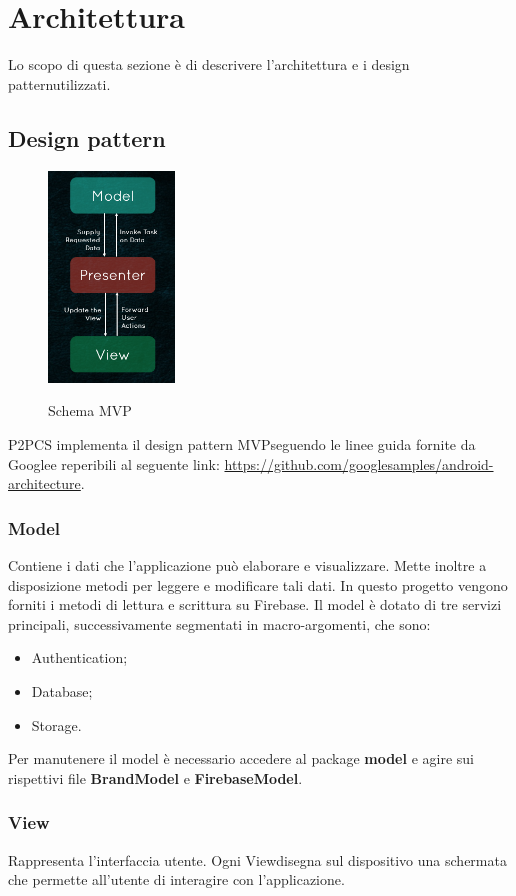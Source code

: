 \section{Architettura}
Lo scopo di questa sezione è di descrivere l'architettura e i design pattern\glosp utilizzati.
\subsection{Design pattern}
\begin{figure}[H]
	\centering
	\includegraphics[width=0.3\textwidth]
	{res/images/mvp.png}\\
	\caption{Schema MVP}
	\label{Schema MVP}
\end{figure}
P2PCS implementa il design pattern MVP\glosp seguendo le linee guida fornite da Google\glosp e reperibili al seguente link: \url{https://github.com/googlesamples/android-architecture}.
\newline
\subsubsection{Model}
Contiene i dati che l’applicazione può elaborare e visualizzare. Mette inoltre a disposizione metodi per leggere e modificare tali dati.
In questo progetto vengono forniti i metodi di lettura e scrittura su Firebase\glo.
Il model è dotato di tre servizi principali, successivamente segmentati in macro-argomenti, che sono:
\begin{itemize}
	\item Authentication;
	\item Database;
	\item Storage.
\end{itemize}

Per manutenere il model è necessario accedere al package \textbf{model} e agire sui rispettivi file \textbf{BrandModel} e \textbf{FirebaseModel}.
\subsubsection{View}
Rappresenta l’interfaccia utente. Ogni View\glosp disegna sul dispositivo una schermata che permette all'utente di interagire con l’applicazione.

